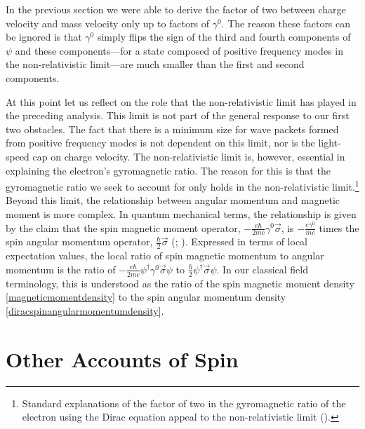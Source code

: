 \documentclass[12pt,secnumarabic,amsmath,amssymb,balancelastpage,nofootinbib]{article}
\begin{document}
In the previous section we were able to derive the factor of two between charge velocity and mass velocity only up to factors of $\gamma^0$.  The reason these factors can be ignored is that $\gamma^0$ simply flips the sign of the third and fourth components of $\psi$ and these components---for a state composed of positive frequency modes in the non-relativistic limit---are much smaller than the first and second components.

At this point let us reflect on the role that the non-relativistic limit has played in the preceding analysis.  This limit is not part of the general response to our first two obstacles.  The fact that there is a minimum size for wave packets formed from positive frequency modes is not dependent on this limit, nor is the light-speed cap on charge velocity.  The non-relativistic limit is, however, essential in explaining the electron's gyromagnetic ratio.  The reason for this is that the gyromagnetic ratio we seek to account for only holds in the non-relativistic limit.\footnote{Standard explanations of the factor of two in the gyromagnetic ratio of the electron using the Dirac equation appeal to the non-relativistic limit (\citealp[section 1.4]{bjorkendrell}).}  Beyond this limit, the relationship between angular momentum and magnetic moment is more complex.  In quantum mechanical terms, the relationship is given by the claim that the spin magnetic moment operator, $- \frac{e\hbar}{2 m c} \gamma^0 \vec{\sigma}$, is $-\frac{e\gamma^0}{m c}$ times the spin angular momentum operator, $\frac{\hbar}{2}\vec{\sigma}$ (\citealp[pg.\ 504]{ohanian}; \citealp[pg.\ 323]{frenkel}).  Expressed in terms of local expectation values, the local ratio of spin magnetic momentum to angular momentum is the ratio of $- \frac{e\hbar}{2 m c} \psi^\dagger \gamma^0 \vec{\sigma}\psi$ to $\frac{\hbar}{2}\psi^\dagger \vec{\sigma} \psi$.  In our classical field terminology, this is understood as the ratio of the spin magnetic moment density \eqref{magneticmomentdensity} to the spin angular momentum density \eqref{diracspinangularmomentumdensity}.







\section{Other Accounts of Spin}
\end{document}
